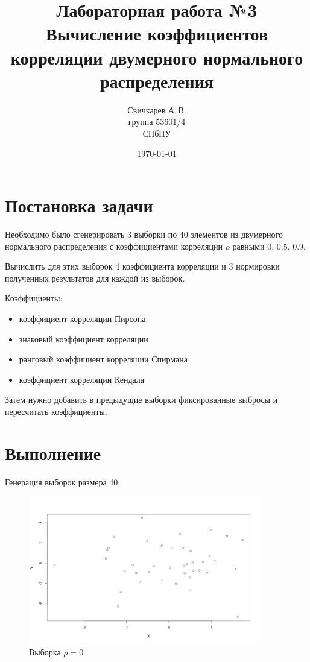 \documentclass{article} %
\title{Лабораторная работа №3\\Вычисление коэффициентов корреляции двумерного нормального распределения} %
\author{Свичкарев А.\,В.\\группа 53601/4\\СПбПУ} %
\date{\today} %
\begin{document}

\maketitle %

\section{Постановка задачи}
Необходимо было сгенерировать 3 выборки по 40 элементов из двумерного нормального распределения с коэффициентами корреляции $\rho$ равными 0, 0.5, 0.9.

Вычислить для этих выборок 4 коэффициента корреляции и 3 нормировки полученных результатов для каждой из выборок.

Коэффициенты:
\begin{itemize}
    \item коэффициент корреляции Пирсона 
    \item знаковый коэффициент корреляции 
    \item ранговый коэффициент корреляции Спирмана 
    \item коэффициент корреляции Кендала
\end{itemize}

Затем нужно добавить в предыдущие выборки фиксированные выбросы и пересчитать коэффициенты.

\newpage
\section{Выполнение}

Генерация выборок размера 40:

\begin{figure}[H]
    \captionsetup{justification=centering}
    \includegraphics[width=0.9\textwidth]{plot0}
    \caption{Выборка $\rho = 0$}
\end{figure}
\end{document}

